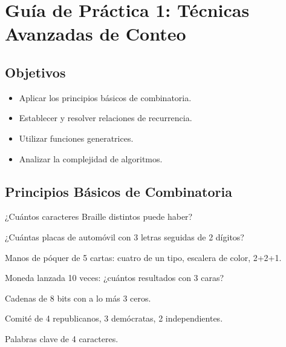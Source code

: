 \chapter{Guía de Práctica 1: Técnicas Avanzadas de Conteo}

\section{Objetivos}
\begin{itemize}
  \item Aplicar los principios básicos de combinatoria.
  \item Establecer y resolver relaciones de recurrencia.
  \item Utilizar funciones generatrices.
  \item Analizar la complejidad de algoritmos.
\end{itemize}

\section{Principios Básicos de Combinatoria}

\begin{ejercicio}
¿Cuántos caracteres Braille distintos puede haber?
\end{ejercicio}

\begin{ejercicio}
¿Cuántas placas de automóvil con 3 letras seguidas de 2 dígitos?
\end{ejercicio}

\begin{ejercicio}
Manos de póquer de 5 cartas: cuatro de un tipo, escalera de color, 2+2+1.
\end{ejercicio}

\begin{ejercicio}
Moneda lanzada 10 veces: ¿cuántos resultados con 3 caras?
\end{ejercicio}

\begin{ejercicio}
Cadenas de 8 bits con a lo más 3 ceros.
\end{ejercicio}

\begin{ejercicio}
Comité de 4 republicanos, 3 demócratas, 2 independientes.
\end{ejercicio}

\begin{ejercicio}
Palabras clave de 4 caracteres.
\end{ejercicio}

